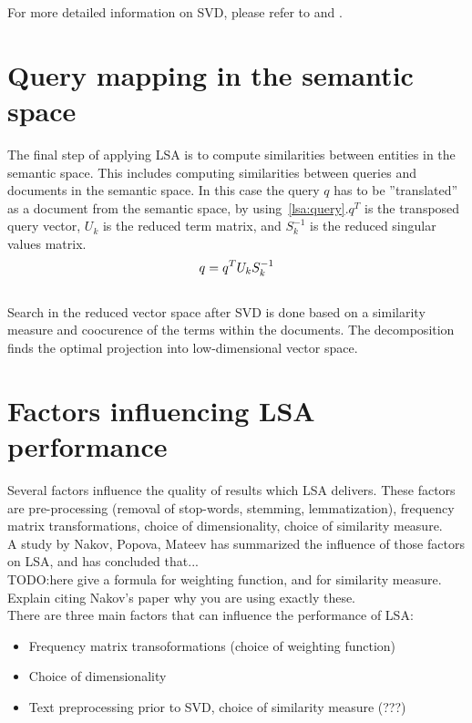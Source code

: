 For more detailed information on \gls{SVD}, please refer to \cite{Berry95usinglinear} and \cite{MatrixCompGolub96}.\\

\section{Query mapping in the semantic space}

The final step of applying \gls{LSA} is to compute similarities between entities in the semantic space. This includes computing similarities between queries and documents in the semantic space. In this case the query $q$ has to be ''translated'' as a document from the semantic space, by using~\ref{lsa:query}.$q^{T}$ is the transposed query vector, $U_{k}$ is the reduced term matrix, and $S_{k}^{-1}$ is the reduced singular values matrix.\\

%
%
\begin{equation}\label{lsa:query}
q = q^{T}U_{k}S_{k}^{-1}\\
\end{equation}\\

Search in the reduced vector space after \gls{SVD} is done based on a similarity measure and coocurence of the terms within the documents. The decomposition finds the optimal projection into low-dimensional vector space.\\

\section{Factors influencing LSA performance}

Several factors influence the quality of results which LSA delivers. These factors are pre-processing (removal of stop-words, stemming, lemmatization), frequency matrix transformations, choice of dimensionality, choice of similarity measure.\\
A study by Nakov, Popova, Mateev\cite{Nakov_weightfunctions} has summarized the influence of those factors on LSA, and has concluded that...\\

TODO:here give a formula for weighting function, and for similarity measure. Explain citing Nakov's paper why you are using exactly these. \\

There are three main factors that can influence the performance of LSA\cite{Nakov_weightfunctions}\cite{NakovBetterResultsLSI}:\\
\begin{itemize}
\item Frequency matrix transoformations (choice of weighting function)
\item Choice of dimensionality
\item Text preprocessing prior to SVD, choice of similarity measure (???)
\end{itemize}

